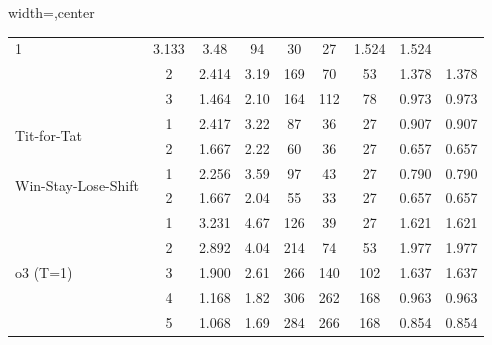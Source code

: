 \begin{table}[htbp]
\begin{adjustbox}{width=\textwidth,center}
\begin{tabular}{|l|c|c|c|c|c|c|c|c|}
1 & 
3.133 & 
3.48 & 
94 & 
30 & 
27 & 
1.524 & 
1.524 \\
 & 
2 & 
2.414 & 
3.19 & 
169 & 
70 & 
53 & 
1.378 & 
1.378 \\
 & 
3 & 
1.464 & 
2.10 & 
164 & 
112 & 
78 & 
0.973 & 
0.973 \\
\hline
\multirow{2}{*}{Tit-for-Tat} & 
1 & 
2.417 & 
3.22 & 
87 & 
36 & 
27 & 
0.907 & 
0.907 \\
 & 
2 & 
1.667 & 
2.22 & 
60 & 
36 & 
27 & 
0.657 & 
0.657 \\
\hline
\multirow{2}{*}{Win-Stay-Lose-Shift} & 
1 & 
2.256 & 
3.59 & 
97 & 
43 & 
27 & 
0.790 & 
0.790 \\
 & 
2 & 
1.667 & 
2.04 & 
55 & 
33 & 
27 & 
0.657 & 
0.657 \\
\hline
\multirow{5}{*}{o3 (T=1)} & 
1 & 
3.231 & 
4.67 & 
126 & 
39 & 
27 & 
1.621 & 
1.621 \\
 & 
2 & 
2.892 & 
4.04 & 
214 & 
74 & 
53 & 
1.977 & 
1.977 \\
 & 
3 & 
1.900 & 
2.61 & 
266 & 
140 & 
102 & 
1.637 & 
1.637 \\
 & 
4 & 
1.168 & 
1.82 & 
306 & 
262 & 
168 & 
0.963 & 
0.963 \\
 & 
5 & 
1.068 & 
1.69 & 
284 & 
266 & 
168 & 
0.854 & 
0.854 \\
\hline
\end{tabular}
\end{adjustbox}
\end{table}

\clearpage


